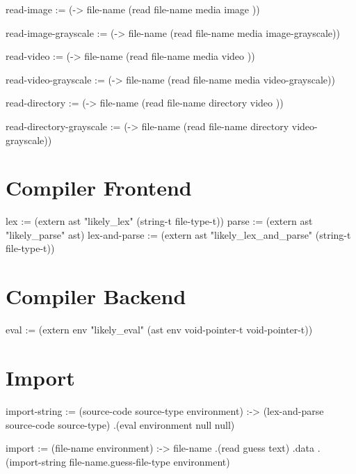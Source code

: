 \documentclass[twoside=false, numbers=noenddot]{scrbook}
\newenvironment{likely}
{ \verbatim }
{ \endverbatim }
\begin{document}
\begin{likely}
read-image :=
  (-> file-name (read file-name media     image          ))

read-image-grayscale :=
  (-> file-name (read file-name media     image-grayscale))

read-video :=
  (-> file-name (read file-name media     video          ))

read-video-grayscale :=
  (-> file-name (read file-name media     video-grayscale))

read-directory :=
  (-> file-name (read file-name directory video          ))

read-directory-grayscale :=
  (-> file-name (read file-name directory video-grayscale))
\end{likely}

\section{Compiler Frontend}
\begin{likely}
lex   := (extern ast "likely_lex" (string-t file-type-t))
parse := (extern ast "likely_parse" ast)
lex-and-parse := (extern ast
                         "likely_lex_and_parse"
                         (string-t file-type-t))
\end{likely}

\section{Compiler Backend}
\begin{likely}
eval := (extern env
                "likely_eval"
                (ast env void-pointer-t void-pointer-t))
\end{likely}

\section{Import}
\begin{likely}
import-string :=
  (source-code source-type environment) :->
    (lex-and-parse source-code source-type)
   .(eval environment null null)

import :=
  (file-name environment) :->
    file-name
   .(read guess text)
   .data
   .(import-string file-name.guess-file-type environment)
\end{likely}
\end{document}
